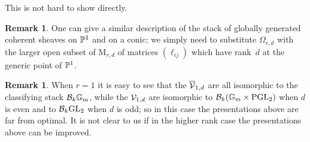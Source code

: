\documentclass{amsart}
\numberwithin{equation}{section}
\numberwithin{subsection}{section}
\theoremstyle{definition}
\newtheorem{remark}[theorem]{Remark}
\theoremstyle{remark}
\newcommand\rM{\mathrm{M}} \newcommand\rN{\mathrm{N}}
\newcommand{\vectp}[1][r,d]{\overline{\cV}_{#1}}
\newcommand{\vect}[1][r,d]{\cV_{#1}}
\newcommand{\pone}{\PP^{1}}
\newcommand{\om}[1][r,d]{\Omega_{#1}}
\newcommand{\mm}[1][r,d]{\rM_{#1}}
\newcommand{\GL}{\mathrm{GL}}
\newcommand{\PGL}{\mathrm{PGL}}
\newcommand{\gm}{\mathbb{G}_{\mathrm{m}}}
\begin{document}
This is not hard to show directly.

\begin{remark}
One can give a similar description of the stack of globally generated coherent sheaves on $\pone$ and on a conic; we simply need to substitute $\om$ with the larger open subset of $\mm$ of matrices $(\ell_{ij})$ which have rank~$d$ at the generic point of $\pone$.
\end{remark}

\begin{remark}
When $r = 1$ it is easy to see that the $\vectp[1,d]$ are all isomorphic to the classifying stack $\cB_{k}\gm$, while the $\vect[1,d]$ are isomorphic to $\cB_{k}(\gm \times \PGL_{2})$ when $d$ is even and to $\cB_{k}\GL_{2}$ when $d$ is odd; so in this case the presentations above are far from optimal. It is not clear to us if in the higher rank case the presentations above can be improved.
\end{remark}
\end{document}
